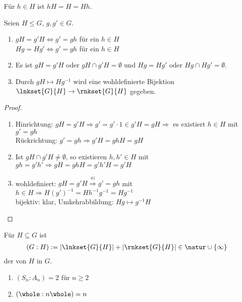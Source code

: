\begin{example}
	Für $h\in H$ ist $hH=H=Hh$.
\end{example}

\begin{lemma}
	Seien $H\le G$, $g,g'\in G$.
	\begin{enumerate}[label=(\alph*)]
		\item $gH=g'H\Leftrightarrow g'=gh$ für ein $h\in H$ \\
		$Hg=Hg'\Leftrightarrow g'=gh$ für ein $h\in H$
		\item Es ist $gH=g'H$ oder $gH\cap g'H=\emptyset$ und $Hg=Hg'$ oder $Hg\cap Hg'=\emptyset$.
		\item Durch $gH\mapsto Hg^{-1}$ wird eine wohldefinierte Bijektion $\lnkset{G}{H}\to\rnkset{G}{H}$ gegeben.
	\end{enumerate}
\end{lemma}
\begin{proof}
	\begin{enumerate}[label=(\alph*)]
		\item Hinrichtung: $gH=g'H\Rightarrow g'=g'\cdot 1\in g'H=gH\Rightarrow$ es existiert $h\in H$ mit $g'=gh$ \\
		Rückrichtung: $g'=gh\Rightarrow g'H=ghH=gH$
		\item Ist $gH\cap g'H\neq\emptyset$, so existieren $h,h'\in H$ mit $gh=g'h'\Rightarrow gH=ghH=g'h'H=g'H$
		\item wohldefiniert: $gH=g'H\overset{a)}{\Rightarrow}g'=gh$ mit $h\in H\Rightarrow H(g')^{-1}=Hh^{-1}g^{-1}=Hg^{-1}$ \\
		bijektiv: klar, Umkehrabbildung: $Hg\mapsto g^{-1}H$ 
	\end{enumerate}
\end{proof}

\begin{definition}[Index]
	Für $H\subseteq G$ ist
	\begin{align}
		(G:H):=\vert\lnkset{G}{H}\vert + \vert\rnkset{G}{H}\vert\in\natur\cup\{\infty\}\notag
	\end{align}
	der  von $H$ in $G$.
\end{definition}

\begin{example}
	\begin{enumerate}[label=(\alph*)]
		\item $(S_n:A_n)=2$ für $n\ge 2$
		\item $(\whole:n\whole)=n$
	\end{enumerate}
\end{example}

